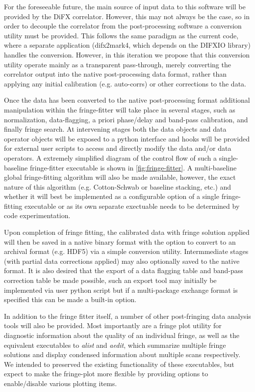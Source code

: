 \documentclass[hidelinks]{article}
\begin{document}
For the foreseeable future, the main source of input data to this software will be provided by the DiFX correlator. However, this may not always
be the case, so in order to decouple the correlator from the post-processing software a conversion utility must be provided. This follows
the same paradigm as the current code, where a separate application (difx2mark4, which depends on the DIFXIO library) handles the conversion. However,
in this iteration we propose that this conversion utility operate mainly as a transparent pass-through, merely
converting the correlator output into the native post-processing data format, rather than applying any initial calibration (e.g. auto-corrs) or
other corrections to the data.

Once the data has been converted to the native post-processing format additional manipulation within the fringe-fitter will take place in several stages, such as normalization, data-flagging, a priori phase/delay and band-pass calibration, and finally fringe search. At intervening stages
both the data objects and data operator objects will be exposed to a python interface and hooks will be provided for external user scripts to 
access and directly modify the data and/or data operators. A extremely simplified diagram of the control flow of such a single-baseline fringe-fitter executable is shown in \ref{fig:fringe-fitter}. A multi-baseline global fringe-fitting algorithm will also be made available, however, the exact nature of this algorithm (e.g. Cotton-Schwab or baseline stacking, etc.) and whether it will best be implemented as a configurable option of a single fringe-fitting executable or as its own separate exectuable needs to be determined
by code experimentation.

Upon completion of fringe fitting, the calibrated data with fringe solution applied will then be saved in a native binary format with the option to convert to an archival format (e.g. HDF5) via a simple conversion utility. Intermmediate stages (with partial data corrections applied) may also optionally saved to the native format. It is also desired that
the export of a data flagging table and band-pass correction table be made possible, such an export tool may initially be implemented via user python script but if a multi-package exchange format is specified this can be made a built-in option.

In addition to the fringe fitter itself, a number of other post-fringing data analysis tools will also be provided. Most importantly are
a fringe plot utility for diagnostic information about the quality of an individual fringe, as well as the equivalent executables to \textit{alist} and \textit{aedit}, which summarize multiple fringe solutions and display condensed information about multiple scans respectively.
We intended to preserved the existing functionality of these executables, but expect to make the fringe-plot more flexible by providing options
to enable/disable various plotting items.
\end{document}
